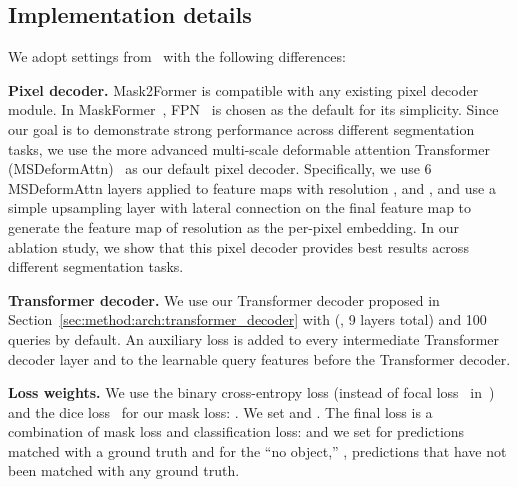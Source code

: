 \documentclass[10pt,twocolumn,letterpaper]{article}
\newcommand{\modelname}{Mask2Former\xspace}
\newcommand{\secref}[1]{Section~\ref{#1}}
\begin{document}
\begin{table*}[t]
   \caption{\textbf{Instance segmentation on COCO \texttt{val2017} with 80 categories.} \modelname outperforms strong Mask R-CNN~\cite{he2017mask} baselines for both AP and AP~\cite{cheng2021boundary} metrics when training with  fewer epochs. Our best model is also competitive to the state-of-the-art specialized instance segmentation model on COCO and has higher boundary quality. For a fair comparison, we only consider single-scale inference and models trained using only COCO \texttt{train2017} set data.
Backbones pre-trained on ImageNet-22K are marked with .}

\vspace{-3mm}

\label{tab:insseg:coco}
\end{table*}





\subsection{Implementation details}
\label{sec:exp:impl}
\noindent We adopt settings from~\cite{cheng2021maskformer} with the following differences:


\noindent\textbf{Pixel decoder.} \modelname is compatible with any existing pixel decoder module. In MaskFormer~\cite{cheng2021maskformer}, FPN~\cite{lin2016feature} is chosen as the default for its simplicity. Since our goal is to demonstrate strong performance across different segmentation tasks, we use the more advanced multi-scale deformable attention Transformer (MSDeformAttn)~\cite{zhu2021deformable} as our default pixel decoder. Specifically, we use 6 MSDeformAttn layers applied to feature maps with resolution ,  and ,
and use a simple upsampling layer with lateral connection on the final  feature map to generate the  feature map of resolution  as the per-pixel embedding.
In our ablation study, we show that this pixel decoder provides best results across different segmentation tasks.

\noindent\textbf{Transformer decoder.} We use our Transformer decoder proposed in \secref{sec:method:arch:transformer_decoder} with  (\ie, 9 layers total) and 100 queries by default. An auxiliary loss is added to every intermediate Transformer decoder layer and to the learnable query features before the Transformer decoder.

\noindent\textbf{Loss weights.} We use the binary cross-entropy loss (instead of focal loss~\cite{lin2017focal} in~\cite{cheng2021maskformer}) and the dice loss~\cite{milletari2016v} for our mask loss: . We set  and . The final loss is a combination of mask loss and classification loss:  and we set  for predictions matched with a ground truth and  for the ``no object,'' \ie, predictions that have not been matched with any ground truth.
\end{document}
